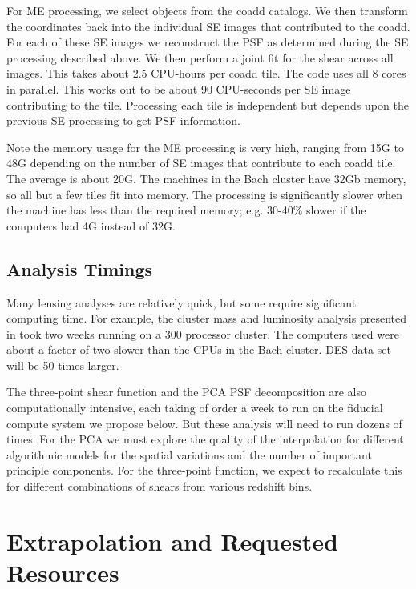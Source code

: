 \documentclass[12pt]{article}
\begin{document}
For ME processing, we select objects from the coadd catalogs.  We then
transform the coordinates back into the individual SE images that contributed
to the coadd.  For each of these SE images we reconstruct the PSF as determined
during the SE processing described above. We then perform a joint fit for the
shear across all images.  This takes about 2.5 CPU-hours per coadd tile. The
code uses all 8 cores in parallel. This works out to be about 90 CPU-seconds
per SE image contributing to the tile.  Processing each tile is independent but
depends upon the previous SE processing to get PSF information.

Note the memory usage for the ME processing is very high, ranging from 15G to
48G depending on the number of SE images that contribute to each coadd tile.
The average is about 20G.  The machines in the Bach cluster have 32Gb memory,
so all but a few tiles fit into memory.  The processing is significantly slower
when the machine has less than the required memory; e.g. 30-40\% slower if the
computers had 4G instead of 32G. 

\subsection{Analysis Timings}

Many lensing analyses are relatively quick, but some require significant
computing time.  For example, the cluster mass and luminosity analysis
presented in \cite{SheldonM2L07} took two weeks running on a 300 processor
cluster.  The computers used were about a factor of two slower than the CPUs in
the Bach cluster.  DES data set will be 50 times larger.  

The three-point shear function and the PCA PSF decomposition are also
computationally intensive, each taking of order a week to run on the fiducial
compute system we propose below.  But these analysis will need to run dozens of
times: For the PCA we must explore the quality of the interpolation for
different algorithmic models for the spatial variations and the number of
important principle components.  For the three-point function, we expect to
recalculate this for different combinations of shears from various redshift
bins.



\section{Extrapolation and Requested Resources}
\end{document}
